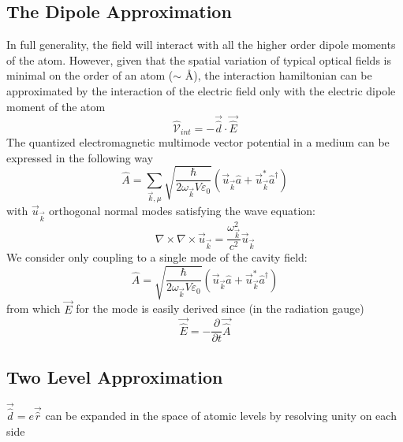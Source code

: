 \documentclass[reqno]{amsart}
\newcommand{\cre}{\hat{a}^\dagger}
\newcommand{\ann}{\hat{a}}
\begin{document}
\subsection{The Dipole Approximation}
In full generality, the field will interact with all the higher order dipole moments of the atom. However, given that the spatial variation of typical optical fields is minimal on the order of an atom ($\sim$ \AA), the interaction hamiltonian can be approximated by the interaction of the electric field only with the electric dipole moment of the atom 
\begin{equation}
	\hat{\mathscr{V}}_{int} = -\vec{\hat{d}} \cdot \vec{\hat{E}}
\end{equation}
The quantized electromagnetic multimode vector potential in a medium can be expressed in the following way \autocite[271-273]{Novotny2006}
\begin{equation}
	\hat{A} = \sum_{\vec{k}, \mu} \sqrt{\frac{\hbar}{2\omega_{\vec{k}} V \varepsilon_0}} (\vec{u}_{\vec{k}} \ann + \vec{u}^*_{\vec{k}} \cre )
\end{equation}
with $\vec{u}_{\vec{k}}$ orthogonal normal modes satisfying the wave equation:
\begin{equation}
	\nabla \times \nabla \times \vec{u}_{\vec{k}} = \frac{\omega_{\vec{k}}^2}{c^2}  \vec{u}_{\vec{k}}
\end{equation}
We consider only coupling to a single mode of the cavity field:
\begin{equation}
	\hat{A} =  \sqrt{\frac{\hbar}{2\omega_{\vec{k}} V \varepsilon_0}} (\vec{u}_{\vec{k}} \ann + \vec{u}^*_{\vec{k}} \cre )
\end{equation}
from which $\vec{E}$ for the mode is easily derived since (in the radiation gauge)
\begin{equation}
	\vec{\hat{E}} = -\frac{\partial}{\partial t}\vec{\hat{A}}
\end{equation}
\subsection{Two Level Approximation}
$\vec{\hat{d}} = e \vec{\hat{r}}$ can be expanded in the space of atomic levels by resolving unity on each side
\end{document}
